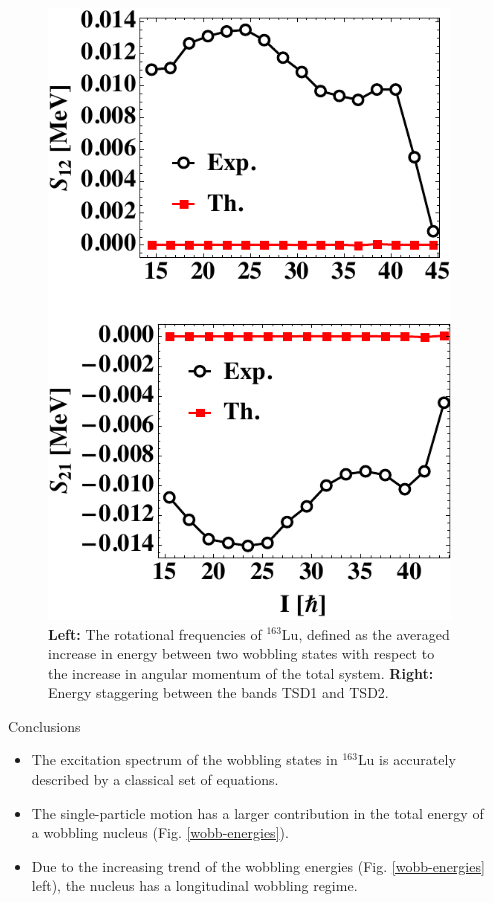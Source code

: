\documentclass[final]{beamer}
\newlength{\sepwidth}
\newlength{\colwidth}
\newcommand{\separatorcolumn}{\begin{column}{\sepwidth}\end{column}}
\begin{document}
\begin{frame}[t]
\begin{columns}[t]
\begin{column}{\colwidth}
\begin{figure}
\begin{minipage}{.35\textwidth}
 \includegraphics[scale=1.2]{images/staggers.pdf}
\end{minipage}
    \caption{\textbf{Left:} The rotational frequencies of $^{163}$Lu, defined as the averaged increase in energy between two wobbling states with respect to the increase in angular momentum of the total system. \textbf{Right:} Energy staggering between the bands TSD1 and TSD2.}
    \label{rotational-freqs}
\end{figure}
    \begin{block}{Conclusions}
\begin{itemize}
    \item The excitation spectrum of the wobbling states in $^{163}$Lu is accurately described by a classical set of equations.
    \item The single-particle motion has a larger contribution in the total energy of a wobbling nucleus (Fig. \ref{wobb-energies}).
    \item Due to the increasing trend of the wobbling energies (Fig. \ref{wobb-energies} left), the nucleus has a longitudinal wobbling regime.
\end{itemize}
  \end{block}
\end{column}
\separatorcolumn
\end{columns}
\end{frame}
\end{document}
